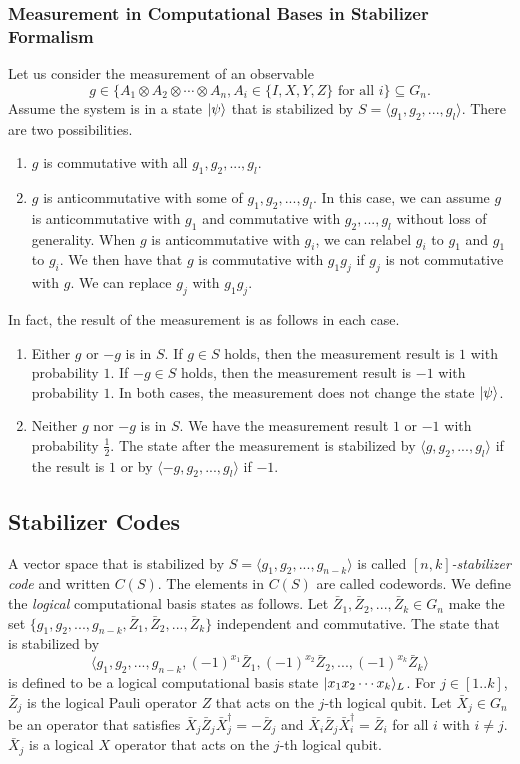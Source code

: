 \subsubsection{Measurement in Computational Bases in Stabilizer 
Formalism}
Let us consider the measurement of an observable 
\[
g \in
\{A_1 \otimes A_2 \otimes \cdots \otimes
A_n, A_i \in \{I, X, Y, Z\} \mbox{ for all } i\} \subseteq G_n.
\]
Assume the system is in a state $|\psi\rangle$ that is stabilized
by $S = \langle g_1,g_2,...,g_l \rangle$. There are two possibilities.
\begin{enumerate}
 \item $g$ is commutative with all $g_1, g_2,...,g_l$.
 \item $g$ is anticommutative with some of $g_1, g_2,...,g_l$.
       In this case, we can assume $g$ is anticommutative
       with $g_1$ and commutative with
       $g_2,...,g_l$ without loss of generality.
       When $g$ is anticommutative with $g_i$, we can relabel
       $g_i$ to $g_1$ and $g_1$ to $g_i$. We then have that
       $g$ is commutative with $g_1 g_j$ if $g_j$ is not commutative
       with $g$. We can replace $g_j$ with $g_1 g_j$.
\end{enumerate}
In fact, the result of the measurement is as follows in each case.
\begin{enumerate}
 \item Either $g$ or $-g$ is in $S$. If $g \in S$ holds, then
       the measurement result is $1$ with probability $1$.
       If $-g \in S$ holds, then
       the measurement result is $-1$ with probability $1$.
       In both cases, the measurement does not change the state
       $|\psi\rangle$.
 \item Neither $g$ nor $-g$ is in $S$.
       We have the measurement result $1$ or $-1$ with 
       probability $\frac{1}{2}$. The state after the measurement
       is stabilized by $\langle g, g_2, ..., g_l \rangle$ if the
       result is $1$ or by $\langle -g, g_2, ..., g_l \rangle$ if
       $-1$.
\end{enumerate}

\subsection{Stabilizer Codes}
A vector space that is stabilized by 
$S = \langle g_1, g_2,..., g_{n-k} \rangle$ is called
\emph{$[n,k]$-stabilizer code} and written $C(S)$. The elements in $C(S)$
are called codewords.
We define the \emph{logical} computational basis states
as follows. Let $\bar Z_1, \bar Z_2, ..., \bar Z_k \in G_n$ 
make the set $\{g_1, g_2,...,g_{n-k}, \bar Z_1, \bar Z_2,
..., \bar Z_k \}$ independent and commutative.
The state that is stabilized by 
\[
\langle
g_1, g_2,...,g_{n-k}, (-1)^{x_1}\bar Z_1, (-1)^{x_2}\bar Z_2,
..., (-1)^{x_k}\bar Z_k \rangle
\]
 is defined to be a
logical computational basis state $|x_1 x_2 \cdots x_k\rangle_L$.
For $j \in [1..k]$, $\bar Z_j$ is the logical Pauli operator $Z$
that acts on the $j$-th logical qubit.
Let $\bar X_j \in G_n$ be an operator that satisfies
$\bar X_j \bar Z_j \bar X_j^\dagger = - \bar Z_j$ and
$\bar X_i \bar Z_j \bar X_i^\dagger = \bar Z_i$ for all $i$ with
$i \neq j$. $\bar X_j$ is a logical $X$ operator that
acts on the $j$-th logical qubit.

